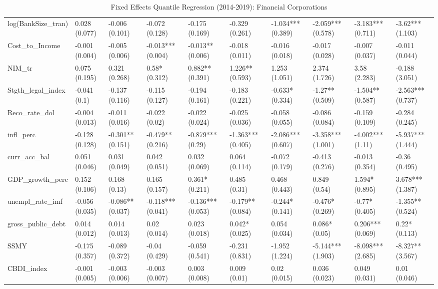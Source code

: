 \begin{table}[H]
\begin{subtable}[c]{\textwidth}
{\begin{tabular}{llllllllll}
  log(BankSize\_tran) & 0.028 (0.077) & -0.006 (0.101) & -0.072 (0.128) & -0.175 (0.169) & -0.329 (0.261) & -1.034*** (0.389) & -2.059*** (0.578) & -3.183*** (0.711) & -3.62*** (1.103) \\ 
  Cost\_to\_Income & -0.001 (0.004) & -0.005 (0.006) & -0.013*** (0.004) & -0.013** (0.006) & -0.018 (0.011) & -0.016 (0.018) & -0.017 (0.028) & -0.007 (0.037) & -0.011 (0.044) \\ 
  NIM\_tr & 0.075 (0.195) & 0.321 (0.268) & 0.58* (0.312) & 0.882** (0.391) & 1.226** (0.593) & 1.253 (1.051) & 2.374 (1.726) & 3.58 (2.283) & -0.188 (3.051) \\ 
  Stgth\_legal\_index & -0.041 (0.1) & -0.137 (0.116) & -0.115 (0.127) & -0.194 (0.161) & -0.183 (0.221) & -0.633* (0.334) & -1.27** (0.509) & -1.504** (0.587) & -2.563*** (0.737) \\ 
  Reco\_rate\_dol & -0.004 (0.013) & -0.011 (0.016) & -0.022 (0.02) & -0.022 (0.024) & -0.025 (0.036) & -0.058 (0.055) & -0.086 (0.084) & -0.159 (0.109) & -0.284 (0.245) \\ 
  infl\_perc & -0.128 (0.128) & -0.301** (0.151) & -0.479** (0.216) & -0.879*** (0.29) & -1.363*** (0.405) & -2.086*** (0.607) & -3.358*** (1.001) & -4.002*** (1.11) & -5.937*** (1.444) \\ 
  curr\_acc\_bal & 0.051 (0.046) & 0.031 (0.049) & 0.042 (0.051) & 0.032 (0.069) & 0.064 (0.114) & -0.072 (0.179) & -0.413 (0.276) & -0.013 (0.354) & -0.36 (0.495) \\ 
  GDP\_growth\_perc & 0.152 (0.106) & 0.168 (0.13) & 0.165 (0.157) & 0.361* (0.211) & 0.485 (0.31) & 0.468 (0.443) & 0.849 (0.54) & 1.594* (0.895) & 3.678*** (1.387) \\ 
  unempl\_rate\_imf & -0.056 (0.035) & -0.086** (0.037) & -0.118*** (0.041) & -0.136*** (0.053) & -0.179** (0.084) & -0.244* (0.141) & -0.476* (0.269) & -0.77* (0.405) & -1.355** (0.524) \\ 
  gross\_public\_debt & 0.014 (0.012) & 0.014 (0.013) & 0.02 (0.014) & 0.023 (0.018) & 0.042* (0.025) & 0.054 (0.034) & 0.086* (0.05) & 0.206*** (0.069) & 0.22* (0.113) \\ 
  SSMY & -0.175 (0.357) & -0.089 (0.372) & -0.04 (0.429) & -0.059 (0.541) & -0.231 (0.831) & -1.952 (1.224) & -5.144*** (1.903) & -8.098*** (2.685) & -8.327** (3.567) \\ 
  CBDI\_index & -0.001 (0.005) & -0.003 (0.006) & -0.003 (0.007) & 0.003 (0.008) & 0.009 (0.01) & 0.02 (0.015) & 0.036 (0.023) & 0.049 (0.031) & 0.01 (0.046) \\ 
   \bottomrule
\end{tabular}}
\end{subtable}

\caption{Fixed Effects Quantile Regression (2014-2019): Financial Corporations} 
\label{qrfe_npl_fi}
\end{table}
